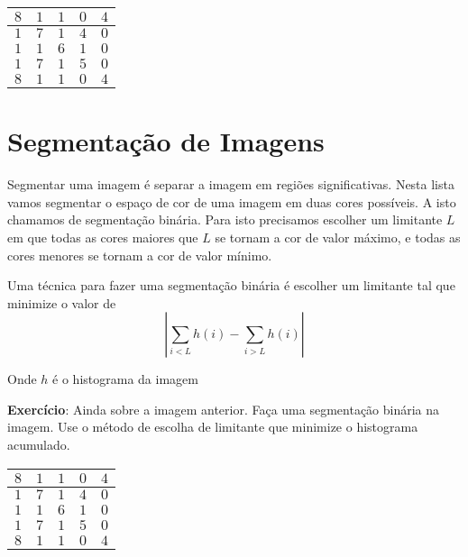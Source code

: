 \documentclass[12pt]{article}
\begin{document}
\begin{tabular}{|c|c|c|c|c|}
\hline
$8$ & $1$ & $1$ & $0$ & $4$ \\ \hline
$1$ & $7$ & $1$ & $4$ & $0$ \\ \hline
$1$ & $1$ & $6$ & $1$ & $0$ \\ \hline
$1$ & $7$ & $1$ & $5$ & $0$ \\ \hline
$8$ & $1$ & $1$ & $0$ & $4$ \\ \hline

\end{tabular}





\break





\section{Segmentação de Imagens}

Segmentar uma imagem é separar a imagem em regiões significativas. Nesta lista vamos segmentar o espaço de cor de uma imagem em duas cores possíveis. A isto chamamos de segmentação binária. Para isto precisamos escolher um limitante $L$ em que todas as cores maiores que $L$ se tornam a cor de valor máximo, e todas as cores menores se tornam a cor de valor mínimo.

Uma técnica para fazer uma segmentação binária é escolher um limitante tal que minimize o valor de 
\[\left| \sum_{i<L}h(i) - \sum_{i>L}h(i)\right|\]

Onde $h$ é o histograma da imagem

\textbf{Exercício}: Ainda sobre a imagem anterior. Faça uma segmentação binária na imagem. Use o método de escolha de limitante que minimize o histograma acumulado.

\begin{tabular}{|c|c|c|c|c|}
\hline
$8$ & $1$ & $1$ & $0$ & $4$ \\ \hline
$1$ & $7$ & $1$ & $4$ & $0$ \\ \hline
$1$ & $1$ & $6$ & $1$ & $0$ \\ \hline
$1$ & $7$ & $1$ & $5$ & $0$ \\ \hline
$8$ & $1$ & $1$ & $0$ & $4$ \\ \hline

\end{tabular}
\end{document}
